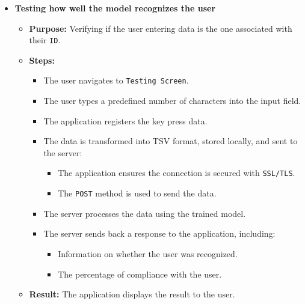 \begin{itemize}
	\item \textbf{Testing how well the model recognizes the user}
	\begin{itemize}
		\item \textbf{Purpose:} Verifying if the user entering data is the one associated with their \texttt{ID}.
		\item \textbf{Steps:}
		\begin{itemize}
			\item The user navigates to \texttt{Testing Screen}.
			\item The user types a predefined number of characters into the input field.
			\item The application registers the key press data.
			\item The data is transformed into TSV format, stored locally, and sent to the server:
			\begin{itemize}
				\item The application ensures the connection is secured with \texttt{SSL/TLS}.
				\item The \texttt{POST} method is used to send the data.
			\end{itemize}
			\item The server processes the data using the trained model.
			\item The server sends back a response to the application, including:
			\begin{itemize}
				\item Information on whether the user was recognized.
				\item The percentage of compliance with the user.
			\end{itemize}
		\end{itemize}
		\item \textbf{Result:} The application displays the result to the user.
	\end{itemize}
	
\end{itemize}